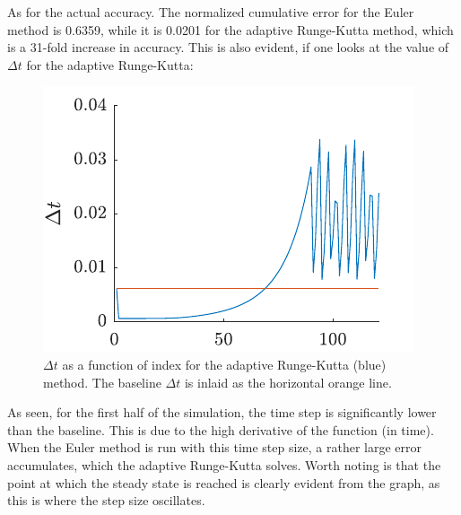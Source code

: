 \documentclass[a4paper,10pt]{article} 	%
\numberwithin{equation}{section}
\begin{document}
	As for the actual accuracy. The normalized cumulative error for the Euler method is 0.6359, while it is 0.0201 for the adaptive Runge-Kutta method, which is a 31-fold increase in accuracy. This is also evident, if one looks at the value of $ \Delta t $ for the adaptive Runge-Kutta:
	
	\begin{figure}[H]
		\centering
		\includegraphics[width = 0.5\linewidth]{Spectraldt.pdf}
		\caption{$ \Delta t $ as a function of index for the adaptive Runge-Kutta (blue) method. The baseline $ \Delta t $ is inlaid as the horizontal orange line.}
		\label{fig:Spectraldt}
	\end{figure}
	As seen, for the first half of the simulation, the time step is significantly lower than the baseline. This is due to the high derivative of the function (in time). When the Euler method is run with this time step size, a rather large error accumulates, which the adaptive Runge-Kutta solves. Worth noting is that the point at which the steady state is reached is clearly evident from the graph, as this is where the step size oscillates.
	
\end{document}

